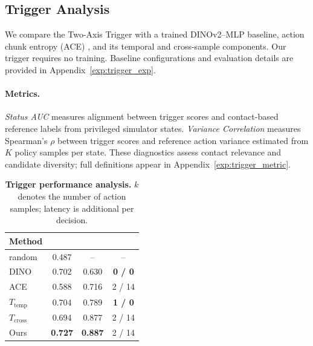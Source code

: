 \documentclass[10pt,twocolumn,letterpaper]{article}
\begin{document}
\subsection{Trigger Analysis}
\label{sec:trigger-analysis}

We compare the Two-Axis Trigger with a trained DINOv2--MLP baseline, action chunk entropy (ACE) \cite{liang2026adaptiveactionchunkinginferencetime}, and its temporal and cross-sample components. Our trigger requires no training. Baseline configurations and evaluation details are provided in Appendix~\ref{exp:trigger_exp}.

\paragraph{Metrics.} \textit{Status AUC} measures alignment between trigger scores and contact-based reference labels from privileged simulator states. \textit{Variance Correlation} measures Spearman's $\rho$ between trigger scores and reference action variance estimated from $K$ policy samples per state. These diagnostics assess contact relevance and candidate diversity; full definitions appear in Appendix~\ref{exp:trigger_metric}.

\begin{table}[t]

    \centering
    \setlength{\tabcolsep}{3pt}
    \small

    \caption{\textbf{Trigger performance analysis.} $k$ denotes the number of action samples; latency is additional per decision.}
\label{tab:trigger}
\begin{tabular}{lccc}
        \toprule
        Method
    & 
    & 
    &  \\
        \midrule
        random & 0.487 & -- & -- \\
        DINO & 0.702 & 0.630 & \textbf{0 / 0} \\
        ACE & 0.588 & 0.716 & 2 / 14 \\
        $T_{\text{temp}}$ & 0.704 & 0.789 & \textbf{1 / 0} \\
        $T_{\text{cross}}$ & 0.694 & 0.877 & 2 / 14 \\
        Ours & \textbf{0.727} & \textbf{0.887} & 2 / 14 \\
        \bottomrule
    \end{tabular}



\end{table}
\end{document}

